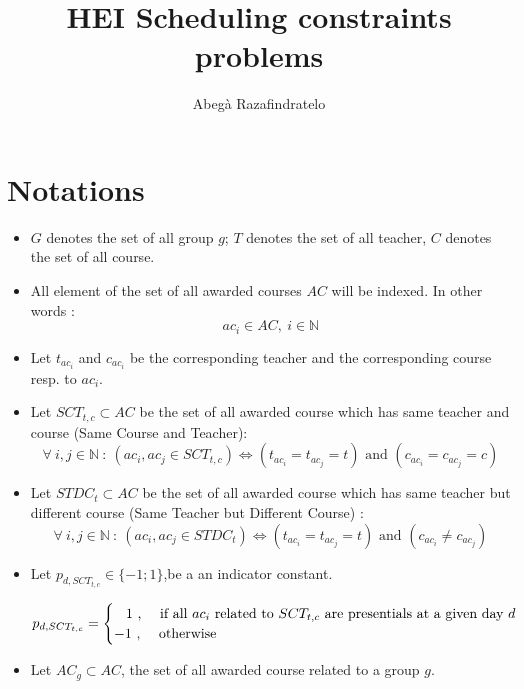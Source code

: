 \documentclass[12pt,a4paper]{article}
\author{Abegà Razafindratelo}
\title{HEI Scheduling constraints problems}
\begin{document}
\maketitle
\section*{Notations}
\begin{itemize}
	
	\item $G$ denotes the set of all group $g$; $T$ denotes the set of all teacher, $C$ denotes the set of all course.
	
	\item All element of the set of all awarded courses $AC$ will be indexed. In other words :
	$$
	 ac_{i} \in AC,\ i \in \mathbb{N}
	$$
	
	\item Let $t_{ac_{i}}$ and $c_{ac_{i}}$ be the corresponding teacher and the corresponding course resp. to  $ac_{i}$.
	
	\item Let $SCT_{t,c} \subset AC$  be the set of all awarded course which has same teacher and course (Same Course and Teacher):
	$$
	\forall \ i, j \in \mathbb{N} \ : \ \left(ac_{i}, ac_{j} \in  SCT_{t,c}\right)                            \Longleftrightarrow \left(t_{ac_{i}} = t_{ac_{j}}  = t \right) \text{ and } 
	\left(c_{ac_{i}} = c_{ac_{j}}  =  c \right)
	$$ 
	
	\item Let $STDC_{t} \subset AC$ be the set of all awarded course which has same teacher but different course (Same Teacher but Different Course) :
	$$
	\forall \ i, j \in \mathbb{N} \ : \ \left(ac_{i}, ac_{j} \in  STDC_{t}\right)                            \Longleftrightarrow \left(t_{ac_{i}} = t_{ac_{j}}  = t \right) \text{ and } 
	\left(c_{ac_{i}} \neq c_{ac_{j}} \right)
	$$ 
	
	\item Let $p_{d, SCT_{t,c}} \in \{-1;1\} $,be a an indicator constant.
	
	$$
	p_{d, SCT_{t,c}} = 
	\begin{cases}
		\hspace{0.3cm} 1 \text{ , \quad if all $ac_i$ related to  $SCT_{t,c}$ are presentials at a given day $d$} \\
		-1 \text{ , \quad otherwise}
	\end{cases} 
	$$
	
	\item Let $AC_{g} \subset AC$, the set of all awarded course related to a group $g$.

\end{itemize}
\end{document}

